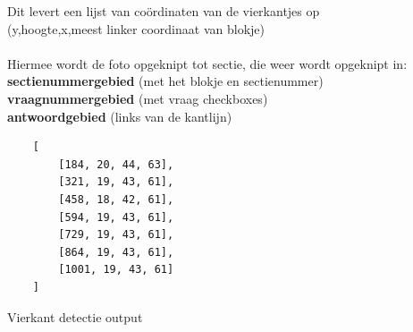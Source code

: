 \documentclass[12pt]{article}
\begin{document}
\begin{multicols}{2}
   Dit levert een lijst van coördinaten van de vierkantjes op\\(y,hoogte,x,meest linker coordinaat van blokje)\\
   \\
   Hiermee wordt de foto opgeknipt tot sectie, die weer wordt opgeknipt in:\\
   \textbf{sectienummergebied} (met het blokje en sectienummer) \\
   \textbf{vraagnummergebied} (met vraag checkboxes) \\
   \textbf{antwoordgebied} (links van de kantlijn)
   
    \begin{listing}[H]
    \begin{verbatim}
    [
        [184, 20, 44, 63], 
        [321, 19, 43, 61], 
        [458, 18, 42, 61], 
        [594, 19, 43, 61], 
        [729, 19, 43, 61], 
        [864, 19, 43, 61], 
        [1001, 19, 43, 61]
    ]
    \end{verbatim}
    \caption{Vierkant detectie output}\label{json-example2}
    \end{listing}

\end{multicols}

\pagebreak
\end{document}
